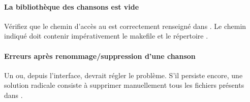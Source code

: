 \paragraph{La bibliothèque des chansons est vide} 
Vérifiez que le chemin d'accès au \recueil{} est correctement
renseigné dans . Le chemin indiqué doit contenir
impérativement le makefile et le répertoire .

\paragraph{Erreurs après renommage/suppression d'une chanson} 
Un  ou, depuis l'interface,  devrait
régler le problème. S'il persiste encore, une solution radicale
consiste à supprimer manuellement tous les fichiers  présents
dans .
